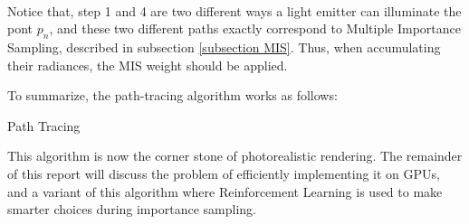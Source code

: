 ~

Notice that, step 1 and 4 are two different ways a light emitter can illuminate the pont $p_n$, and these two different paths exactly correspond to Multiple Importance Sampling, described in subsection \ref{subsection MIS}. Thus, when accumulating their radiances, the MIS weight should be applied.

To summarize, the path-tracing algorithm works as follows:


\begin{algorithm}[H]
    \label{Path Tracing}
    \caption{Path Tracing}
\end{algorithm}

This algorithm is now the corner stone of photorealistic rendering. The remainder of this report will discuss the problem of efficiently implementing it on GPUs, and a variant of this algorithm where Reinforcement Learning is used to make smarter choices during importance sampling.